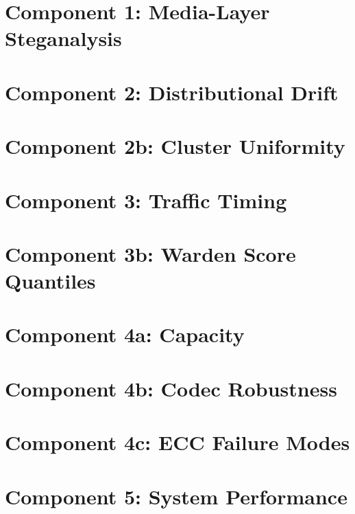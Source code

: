 \documentclass[11pt]{article}
\begin{document}
\section*{Component 1: Media-Layer Steganalysis}


\section*{Component 2: Distributional Drift}


\section*{Component 2b: Cluster Uniformity}


\section*{Component 3: Traffic Timing}


\section*{Component 3b: Warden Score Quantiles}


\section*{Component 4a: Capacity}


\section*{Component 4b: Codec Robustness}


\section*{Component 4c: ECC Failure Modes}


\section*{Component 5: System Performance}

\end{document}
